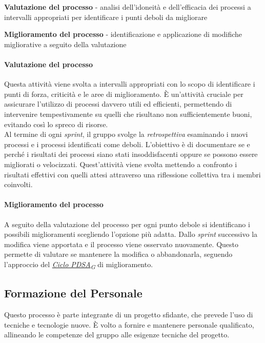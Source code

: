\documentclass[12pt, a4paper]{article}
\newcommand{\urlglossario}{https://skynetunigroup.github.io/Code_Guardian/Documentazione/RTB/glossario_v1.0.0.pdf} %
\newcommand{\glo}[2]{\href{\urlglossario\#nameddest=#2}{#1\textsubscript{G}}}
\begin{document}
\textbf{Valutazione del processo} - analisi dell'idoneità e dell'efficacia dei processi a intervalli appropriati per identificare i punti deboli da migliorare

\textbf{Miglioramento del processo} - identificazione e applicazione di modifiche migliorative a seguito della valutazione

\paragraph{Valutazione del processo}

Questa attività viene svolta a intervalli appropriati con lo scopo di identificare i punti di forza, criticità e le aree di miglioramento. È un'attività cruciale per assicurare l'utilizzo di processi davvero utili ed efficienti, permettendo di intervenire tempestivamente su quelli che risultano non sufficientemente buoni, evitando così lo spreco di risorse.\\
Al termine di ogni \textit{sprint}, il gruppo svolge la \textit{retrospettiva} esaminando i nuovi processi e i processi identificati come deboli. L'obiettivo è di documentare se e perché i risultati dei processi siano stati insoddisfacenti oppure se possono essere migliorati o velocizzati. Quest'attività viene svolta mettendo a confronto i risultati effettivi con quelli attesi attraverso una riflessione collettiva tra i membri coinvolti.

 \paragraph{Miglioramento del processo}

A seguito della valutazione del processo per ogni punto debole si identificano i possibili miglioramenti scegliendo l'opzione più adatta. Dallo \textit{sprint} successivo la modifica viene apportata e il processo viene osservato nuovamente. Questo permette di valutare se mantenere la modifica o abbandonarla, seguendo l'approccio del \textit{\glo{Ciclo PDSA}{ciclo-pdsa}} di miglioramento.

 \subsection{Formazione del Personale}

Questo processo è parte integrante di un progetto sfidante, che prevede l'uso di tecniche e tecnologie nuove. È volto a fornire e mantenere personale qualificato, allineando le competenze del gruppo alle esigenze tecniche del progetto.
\end{document}
